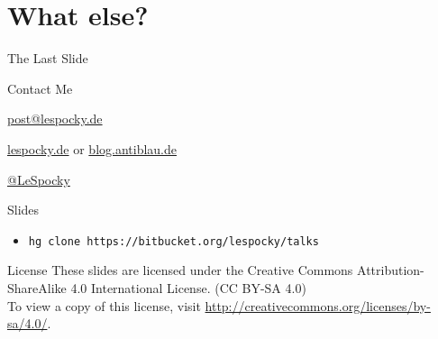 \documentclass[t]{beamer}
\begin{document}
\section*{What else?}


\begin{frame}{The Last Slide}
    \begin{block}{Contact Me}
        \begin{description}[Twitter]
            \item [E-Mail] \href{mailto:post@lespocky.de}{post@lespocky.de}
            \item [WWW] \href{http://www.lespocky.de/}{lespocky.de} or
                    \href{http://blog.antiblau.de/}{blog.antiblau.de}
            \item [Twitter] \href{https://twitter.com/LeSpocky}{@LeSpocky}
        \end{description}
    \end{block}
    \begin{block}{Slides}
        \begin{itemize}
            \item \texttt{hg clone https://bitbucket.org/lespocky/talks}
        \end{itemize}
    \end{block}
    \begin{block}{License}
        These slides are licensed under the Creative Commons
        Attribution-ShareAlike 4.0 International License. (CC BY-SA 4.0) \\
        To view a copy of this license, visit
        \url{http://creativecommons.org/licenses/by-sa/4.0/}.
    \end{block}
\end{frame}
\end{document}
